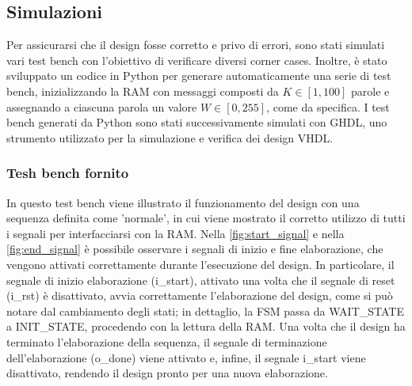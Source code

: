 \documentclass[11pt,a4paper]{article}
\begin{document}
\subsection{Simulazioni}

\hspace{1em} Per assicurarsi che il design fosse corretto e privo di errori, sono stati simulati vari test bench con l'obiettivo di verificare diversi corner cases. Inoltre, è stato sviluppato un codice in Python per generare automaticamente una serie di test bench, inizializzando la RAM con messaggi composti da $K \in [1, 100]$ parole e assegnando a ciascuna parola un valore $W \in [0, 255]$, come da specifica. I test bench generati da Python sono stati successivamente simulati con GHDL, uno strumento utilizzato per la simulazione e verifica dei design VHDL.

\subsubsection{Tesh bench fornito}

In questo test bench viene illustrato il funzionamento del design con una sequenza definita come 'normale', in cui viene mostrato il corretto utilizzo di tutti i segnali per interfacciarsi con la RAM. Nella \autoref{fig:start_signal} e nella \autoref{fig:end_signal} è possibile osservare i segnali di inizio e fine elaborazione, che vengono attivati correttamente durante l'esecuzione del design. In particolare, il segnale di inizio elaborazione (i\_start), attivato una volta che il segnale di reset (i\_rst) è disattivato, avvia correttamente l'elaborazione del design, come si può notare dal cambiamento degli stati; in dettaglio, la FSM passa da WAIT\_STATE a INIT\_STATE, procedendo con la lettura della RAM. Una volta che il design ha terminato l'elaborazione della sequenza, il segnale di terminazione dell'elaborazione (o\_done) viene attivato e, infine, il segnale i\_start viene disattivato, rendendo il design pronto per una nuova elaborazione.

\vspace{0.5em}
\end{document}

